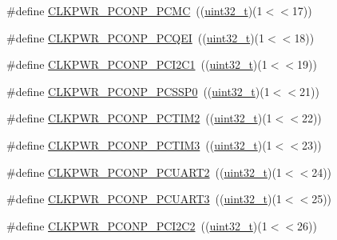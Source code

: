 \begin{DoxyCompactItemize}
\item 
\#define \hyperlink{group___c_l_k_p_w_r___public___macros_ga5a8749edeb4ea582cd48f5f35f2088e6}{C\+L\+K\+P\+W\+R\+\_\+\+P\+C\+O\+N\+P\+\_\+\+P\+C\+MC}~((\hyperlink{_p_e___types_8h_a33594304e786b158f3fb30289278f5af}{uint32\+\_\+t})(1$<$$<$17))
\item 
\#define \hyperlink{group___c_l_k_p_w_r___public___macros_ga0f0ae9eef9bdd20cbeb8789430f6c3ee}{C\+L\+K\+P\+W\+R\+\_\+\+P\+C\+O\+N\+P\+\_\+\+P\+C\+Q\+EI}~((\hyperlink{_p_e___types_8h_a33594304e786b158f3fb30289278f5af}{uint32\+\_\+t})(1$<$$<$18))
\item 
\#define \hyperlink{group___c_l_k_p_w_r___public___macros_ga533db7f7c151a115b487585d29889199}{C\+L\+K\+P\+W\+R\+\_\+\+P\+C\+O\+N\+P\+\_\+\+P\+C\+I2\+C1}~((\hyperlink{_p_e___types_8h_a33594304e786b158f3fb30289278f5af}{uint32\+\_\+t})(1$<$$<$19))
\item 
\#define \hyperlink{group___c_l_k_p_w_r___public___macros_ga4e542d17bed4b5833d41985770a6b44b}{C\+L\+K\+P\+W\+R\+\_\+\+P\+C\+O\+N\+P\+\_\+\+P\+C\+S\+S\+P0}~((\hyperlink{_p_e___types_8h_a33594304e786b158f3fb30289278f5af}{uint32\+\_\+t})(1$<$$<$21))
\item 
\#define \hyperlink{group___c_l_k_p_w_r___public___macros_ga5ad76b83dd27e58d257f43dc400fa4eb}{C\+L\+K\+P\+W\+R\+\_\+\+P\+C\+O\+N\+P\+\_\+\+P\+C\+T\+I\+M2}~((\hyperlink{_p_e___types_8h_a33594304e786b158f3fb30289278f5af}{uint32\+\_\+t})(1$<$$<$22))
\item 
\#define \hyperlink{group___c_l_k_p_w_r___public___macros_ga6d8a03a7e3535a783b132bb8755ca554}{C\+L\+K\+P\+W\+R\+\_\+\+P\+C\+O\+N\+P\+\_\+\+P\+C\+T\+I\+M3}~((\hyperlink{_p_e___types_8h_a33594304e786b158f3fb30289278f5af}{uint32\+\_\+t})(1$<$$<$23))
\item 
\#define \hyperlink{group___c_l_k_p_w_r___public___macros_gac87ef2376877891f6694a6c033d299db}{C\+L\+K\+P\+W\+R\+\_\+\+P\+C\+O\+N\+P\+\_\+\+P\+C\+U\+A\+R\+T2}~((\hyperlink{_p_e___types_8h_a33594304e786b158f3fb30289278f5af}{uint32\+\_\+t})(1$<$$<$24))
\item 
\#define \hyperlink{group___c_l_k_p_w_r___public___macros_gab3c180bc0be3f8ddb32d526262ef0da6}{C\+L\+K\+P\+W\+R\+\_\+\+P\+C\+O\+N\+P\+\_\+\+P\+C\+U\+A\+R\+T3}~((\hyperlink{_p_e___types_8h_a33594304e786b158f3fb30289278f5af}{uint32\+\_\+t})(1$<$$<$25))
\item 
\#define \hyperlink{group___c_l_k_p_w_r___public___macros_ga4882ffb6a89fe73a1fa8817e1a5b54e0}{C\+L\+K\+P\+W\+R\+\_\+\+P\+C\+O\+N\+P\+\_\+\+P\+C\+I2\+C2}~((\hyperlink{_p_e___types_8h_a33594304e786b158f3fb30289278f5af}{uint32\+\_\+t})(1$<$$<$26))
$$
\end{DoxyCompactItemize}
